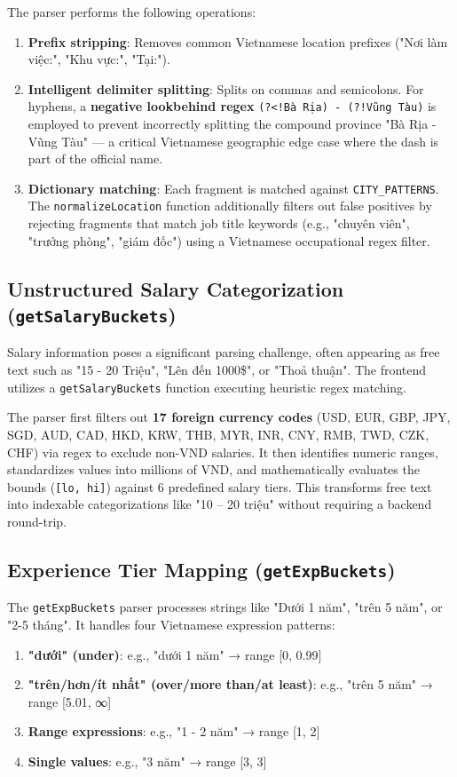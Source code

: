 The parser performs the following operations:
\begin{enumerate}
\item \textbf{Prefix stripping}: Removes common Vietnamese location prefixes ("Nơi làm việc:", "Khu vực:", "Tại:").
\item \textbf{Intelligent delimiter splitting}: Splits on commas and semicolons. For hyphens, a \textbf{negative lookbehind regex} \texttt{(?<!Bà Rịa) - (?!Vũng Tàu)} is employed to prevent incorrectly splitting the compound province "Bà Rịa - Vũng Tàu" — a critical Vietnamese geographic edge case where the dash is part of the official name.
\item \textbf{Dictionary matching}: Each fragment is matched against \texttt{CITY\_PATTERNS}. The \texttt{normalizeLocation} function additionally filters out false positives by rejecting fragments that match job title keywords (e.g., "chuyên viên", "trưởng phòng", "giám đốc") using a Vietnamese occupational regex filter.
\end{enumerate}

\subsection{Unstructured Salary Categorization (\texttt{getSalaryBuckets})}
Salary information poses a significant parsing challenge, often appearing as free text such as "15 - 20 Triệu", "Lên đến 1000\$", or "Thoả thuận". The frontend utilizes a \texttt{getSalaryBuckets} function executing heuristic regex matching.

The parser first filters out \textbf{17 foreign currency codes} (USD, EUR, GBP, JPY, SGD, AUD, CAD, HKD, KRW, THB, MYR, INR, CNY, RMB, TWD, CZK, CHF) via regex to exclude non-VND salaries. It then identifies numeric ranges, standardizes values into millions of VND, and mathematically evaluates the bounds (\texttt{[lo, hi]}) against 6 predefined salary tiers. This transforms free text into indexable categorizations like "10 – 20 triệu" without requiring a backend round-trip.

\subsection{Experience Tier Mapping (\texttt{getExpBuckets})}
The \texttt{getExpBuckets} parser processes strings like "Dưới 1 năm", "trên 5 năm", or "2-5 tháng". It handles four Vietnamese expression patterns:
\begin{enumerate}
\item \textbf{"dưới" (under)}: e.g., "dưới 1 năm" → range [0, 0.99]
\item \textbf{"trên/hơn/ít nhất" (over/more than/at least)}: e.g., "trên 5 năm" → range [5.01, ∞]
\item \textbf{Range expressions}: e.g., "1 - 2 năm" → range [1, 2]
\item \textbf{Single values}: e.g., "3 năm" → range [3, 3]
\end{enumerate}

